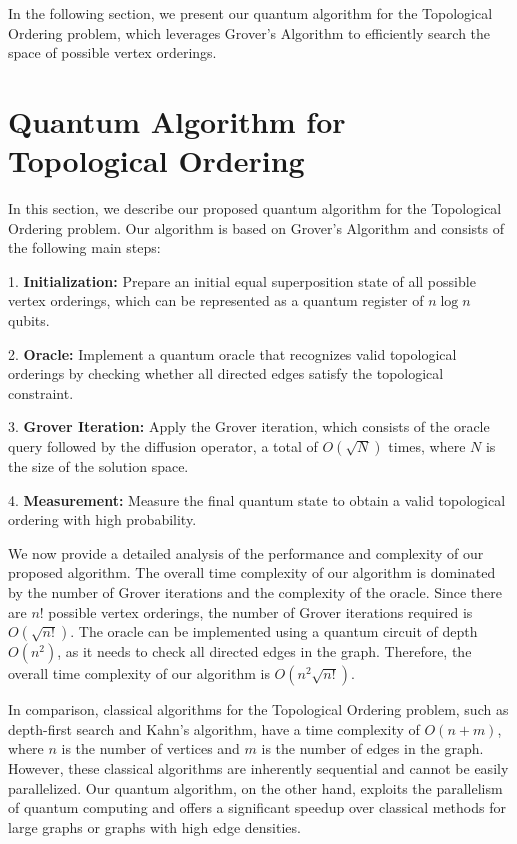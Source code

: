 In the following section, we present our quantum algorithm for the Topological Ordering problem, which leverages Grover's Algorithm to efficiently search the space of possible vertex orderings.

\section{Quantum Algorithm for Topological Ordering}

In this section, we describe our proposed quantum algorithm for the Topological Ordering problem. Our algorithm is based on Grover's Algorithm and consists of the following main steps:

1. \textbf{Initialization:} Prepare an initial equal superposition state of all possible vertex orderings, which can be represented as a quantum register of $n \log n$ qubits.

2. \textbf{Oracle:} Implement a quantum oracle that recognizes valid topological orderings by checking whether all directed edges satisfy the topological constraint.

3. \textbf{Grover Iteration:} Apply the Grover iteration, which consists of the oracle query followed by the diffusion operator, a total of $O(\sqrt{N})$ times, where $N$ is the size of the solution space.

4. \textbf{Measurement:} Measure the final quantum state to obtain a valid topological ordering with high probability.

We now provide a detailed analysis of the performance and complexity of our proposed algorithm. The overall time complexity of our algorithm is dominated by the number of Grover iterations and the complexity of the oracle. Since there are $n!$ possible vertex orderings, the number of Grover iterations required is $O(\sqrt{n!})$. The oracle can be implemented using a quantum circuit of depth $O(n^2)$, as it needs to check all directed edges in the graph. Therefore, the overall time complexity of our algorithm is $O(n^2 \sqrt{n!})$.

In comparison, classical algorithms for the Topological Ordering problem, such as depth-first search and Kahn's algorithm, have a time complexity of $O(n + m)$, where $n$ is the number of vertices and $m$ is the number of edges in the graph. However, these classical algorithms are inherently sequential and cannot be easily parallelized. Our quantum algorithm, on the other hand, exploits the parallelism of quantum computing and offers a significant speedup over classical methods for large graphs or graphs with high edge densities.

